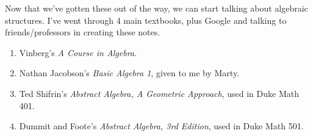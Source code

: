 Now that we've gotten these out of the way, we can start talking about algebraic structures. I've went through 4 main textbooks, plus Google and talking to friends/professors in creating these notes. 
\begin{enumerate}
  \item Vinberg's \textit{A Course in Algebra}. 
  \item Nathan Jacobson's \textit{Basic Algebra 1}, given to me by Marty. 
  \item Ted Shifrin's \textit{Abstract Algebra, A Geometric Approach}, used in Duke Math 401. 
  \item Dummit and Foote's \textit{Abstract Algebra, 3rd Edition}, used in Duke Math 501. 
\end{enumerate}


